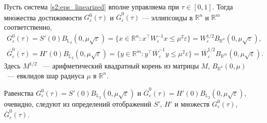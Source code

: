 \documentclass[../main.tex]{subfiles}
\begin{document}
\begin{lemma}
	Пусть система \eqref{s2:eps_linearized} вполне управляема при $\tau \in [0,1]$. 
	Тогда множества достижимости  $G^0_{\varepsilon}(\tau)$ и $\overline{G}^0_{\varepsilon}(\tau)$ --- эллипсоиды в $\mathbb{R}^n$ и $\mathbb{R}^m$ соответственно,
	\begin{gather*}
		 G^0_{\varepsilon}(\tau) = S'(0) B_{\mathbb{L}_2}(0,\mu\sqrt{\varepsilon}) =  \{ x \in \mathbb{R}^n: x^{\top} W^{-1}_{\varepsilon} x \leqslant \mu^2 \varepsilon \} = W^{1/2}_{\varepsilon} B_{\mathbb{R}^n}(0,\mu\sqrt{\varepsilon}), \\
		 \overline{G}^0_{\varepsilon}(\tau) = H'(0) B_{\mathbb{L}_2}(0,\mu\sqrt{\varepsilon}) =  \{ y \in \mathbb{R}^m: y^{\top} \overline{W}^{-1}_{\varepsilon} y \leqslant \mu^2 \varepsilon \} = \overline{W}^{1/2}_{\varepsilon} B_{\mathbb{R}^m}(0,\mu\sqrt{\varepsilon}).
	\end{gather*}
	Здесь $M^{1/2}$ ~--- арифметический квадратный корень из матрицы $M$, $ B_{\mathbb{R}^n}(0,\mu) $ ~--- евклидов шар радиуса $ \mu $ в $ \mathbb{R}^n $.
\end{lemma}
\doc
Равенства $G^0_{\varepsilon}(\tau) = S'(0) B_{\mathbb{L}_2}(0,\mu\sqrt{\varepsilon})$ и $ \overline{G}^0_{\varepsilon}(\tau) = H'(0) B_{\mathbb{L}_2}(0,\mu\sqrt{\varepsilon}) $, очевидно, следуют из определений отображений  $ S' $, $ H' $ и множеств $ G^0_{\varepsilon}(\tau)$, $ \overline{G}^0_{\varepsilon}(\tau)$.
\end{document}
